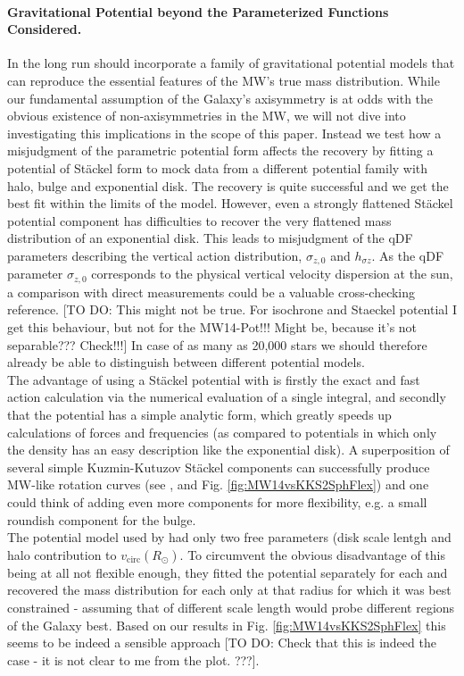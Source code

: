 \paragraph{Gravitational Potential beyond the Parameterized Functions Considered.}  In the long run \RM should incorporate a family of gravitational potential models that can reproduce the essential features of the MW's true mass distribution. While our fundamental assumption of the Galaxy's axisymmetry is at odds with the obvious existence of non-axisymmetries in the MW, we will not dive into investigating this implications in the scope of this paper. Instead we test how a misjudgment of the parametric potential form affects the recovery by fitting a potential of St\"{a}ckel form \citep{bat94} to mock data from a different potential family with halo, bulge and exponential disk. The recovery is quite successful and we get the best fit within the limits of the model. However, even a strongly flattened St\"{a}ckel potential component has difficulties to recover the very flattened mass distribution of an exponential disk. This leads to misjudgment of the qDF parameters describing the vertical action distribution, $\sigma_{z,0}$ and $h_{\sigma z}$. As the qDF parameter $\sigma_{z,0}$ corresponds to the physical vertical velocity dispersion at the sun, a comparison with direct measurements could be a valuable cross-checking reference. [TO DO: This might not be true. For isochrone and Staeckel potential I get this behaviour, but not for the MW14-Pot!!! Might be, because it's not separable??? Check!!!] In case of as many as 20,000 stars we should therefore already be able to distinguish between different potential models.
\\The advantage of using a St\"{a}ckel potential with \RM is firstly the exact and fast action calculation via the numerical evaluation of a single integral, and secondly that the potential has a simple analytic form, which greatly speeds up calculations of forces and frequencies (as compared to potentials in which only the density has an easy description like the exponential disk). A superposition of several simple Kuzmin-Kutuzov St\"{a}ckel components can successfully produce MW-like rotation curves (see \citet{bat94}, \citet{2003MNRAS.340..752F} and Fig. \ref{fig:MW14vsKKS2SphFlex}) and one could think of adding even more components for more flexibility, e.g. a small roundish component for the bulge.
\\The potential model used by \citet{bov13} had only two free parameters (disk scale lentgh and halo contribution to $v_\text{circ}(R_\odot)$. To circumvent the obvious disadvantage of this being at all not flexible enough, they fitted the potential separately for each \MAP and recovered the mass distribution for each \MAP only at that radius for which it was best constrained - assuming that \MAPs of different scale length would probe different regions of the Galaxy best. Based on our results in Fig. \ref{fig:MW14vsKKS2SphFlex} this seems to be indeed a sensible approach [TO DO: Check that this is indeed the case - it is not clear to me from the plot. ???].
